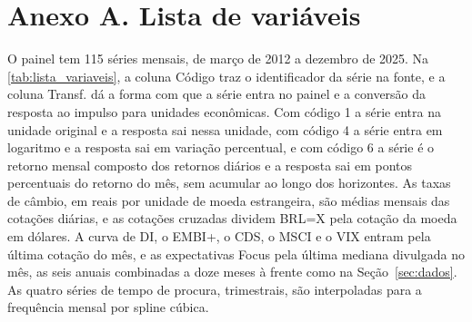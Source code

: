 \documentclass[preprint,authoryear,review,12pt]{elsarticle}
\begin{document}


\section*{Anexo A. Lista de variáveis}\label{anexo-A}

O painel tem 115 séries mensais, de março de 2012 a dezembro de 2025. Na \autoref{tab:lista_variaveis}, a coluna Código traz o identificador da série na fonte, e a coluna Transf. dá a forma com que a série entra no painel e a conversão da resposta ao impulso para unidades econômicas. Com código 1 a série entra na unidade original e a resposta sai nessa unidade, com código 4 a série entra em logaritmo e a resposta sai em variação percentual, e com código 6 a série é o retorno mensal composto dos retornos diários e a resposta sai em pontos percentuais do retorno do mês, sem acumular ao longo dos horizontes. As taxas de câmbio, em reais por unidade de moeda estrangeira, são médias mensais das cotações diárias, e as cotações cruzadas dividem BRL=X pela cotação da moeda em dólares. A curva de DI, o EMBI+, o CDS, o MSCI e o VIX entram pela última cotação do mês, e as expectativas Focus pela última mediana divulgada no mês, as seis anuais combinadas a doze meses à frente como na Seção~\ref{sec:dados}. As quatro séries de tempo de procura, trimestrais, são interpoladas para a frequência mensal por spline cúbica.
\end{document}

